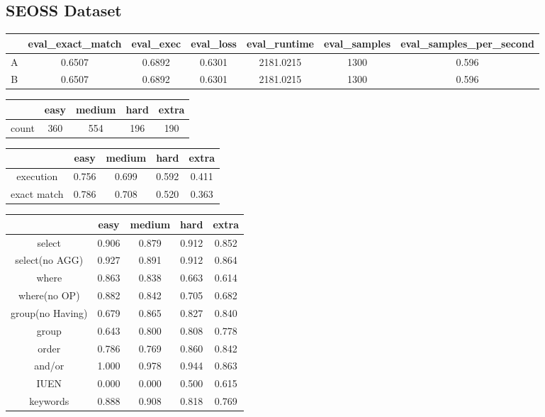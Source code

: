 \subsection{SEOSS Dataset}

\begin{tabular}{|c|c|c|c|c|c|c|}
    \hline
      & eval\_exact\_match & eval\_exec & eval\_loss & eval\_runtime & eval\_samples & eval\_samples\_per\_second \\ \hline
    A & 0.6507             & 0.6892     & 0.6301     & 2181.0215     & 1300          & 0.596                      \\ \hline
    B & 0.6507             & 0.6892     & 0.6301     & 2181.0215     & 1300          & 0.596                      \\ \hline
\end{tabular}

\begin{tabular}{|c|c|c|c|c|}
    \hline
          & easy & medium & hard & extra \\ \hline
    count & 360  & 554    & 196  & 190   \\ \hline
\end{tabular}

\begin{tabular}{|c|c|c|c|c|}
    \hline
                & easy  & medium & hard  & extra \\ \hline
    execution   & 0.756 & 0.699  & 0.592 & 0.411 \\ \hline
    exact match & 0.786 & 0.708  & 0.520 & 0.363 \\ \hline
\end{tabular}

\begin{tabular}{|c|c|c|c|c|}
    \hline
                     & easy  & medium & hard  & extra \\ \hline
    select           & 0.906 & 0.879  & 0.912 & 0.852 \\ \hline
    select(no AGG)   & 0.927 & 0.891  & 0.912 & 0.864 \\ \hline
    where            & 0.863 & 0.838  & 0.663 & 0.614 \\ \hline
    where(no OP)     & 0.882 & 0.842  & 0.705 & 0.682 \\ \hline
    group(no Having) & 0.679 & 0.865  & 0.827 & 0.840 \\ \hline
    group            & 0.643 & 0.800  & 0.808 & 0.778 \\ \hline
    order            & 0.786 & 0.769  & 0.860 & 0.842 \\ \hline
    and/or           & 1.000 & 0.978  & 0.944 & 0.863 \\ \hline
    IUEN             & 0.000 & 0.000  & 0.500 & 0.615 \\ \hline
    keywords         & 0.888 & 0.908  & 0.818 & 0.769 \\ \hline
\end{tabular}

